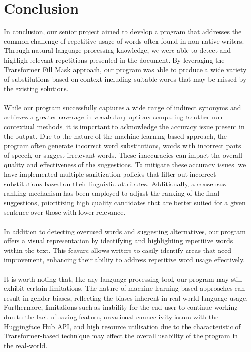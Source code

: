 \documentclass[12pt,oneside,openright,a4paper]{cpe-english-project}
\begin{document}
\chapter{Conclusion}
In conclusion, our senior project aimed to develop a program that addresses the common challenge of repetitive usage of words often found in non-native writers. Through natural language processing knowledge, we were able to detect and highligh relevant repetitions presented in the document. By leveraging the Transformer Fill Mask approach, our program was able to produce a wide variety of substitutions based on context including suitable words that may be missed by the existing solutions.
\\\\
While our program successfully captures a wide range of indirect synonyms and achieves a greater coverage in vocabulary options comparing to other non contextual methods, it is important to acknowledge the accuracy issue present in the output. Due to the nature of the machine learning-based approach, the program often generate incorrect word substitutions, words with incorrect parts of speech, or suggest irrelevant words. These inaccuracies can impact the overall quality and effectiveness of the suggestions. To mitigate these accuracy issues, we have implemented multiple sanitization policies that filter out incorrect substitutions based on their linguistic attributes. Additionally, a consensus ranking mechanism has been employed to adjust the ranking of the final suggestions, prioritizing high quality candidates that are better suited for a given sentence over those with lower relevance.
\\\\
In addition to detecting overused words and suggesting alternatives, our program offers a visual representation by identifying and highlighting repetitive words within the text. This feature allows writers to easily identify areas that need improvement, enhancing their ability to address repetitive word usage effectively.
\\\\
It is worth noting that, like any language processing tool, our program may still exhibit certain limitations. The nature of machine learning-based approaches can result in gender biases, reflecting the biases inherent in real-world language usage. Furthermore, limitations such as inability for the end-user to continue working due to the lack of saving feature, occasional connectivity issues with the Huggingface Hub API, and high resource utilization due to the characteristic of Transformer-based technique may affect the overall usability of the program in the real-world.
\end{document}
